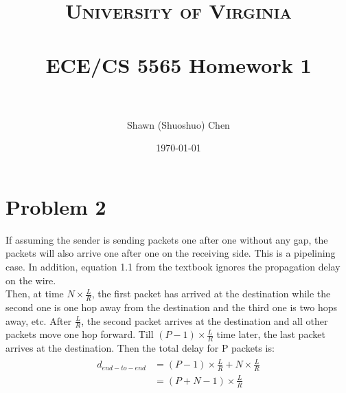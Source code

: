\documentclass[paper=a4, fontsize=11pt]{scrartcl} %
\title{	
\normalfont \normalsize 
\textsc{University of Virginia} \\ [25pt] %
\horrule{0.5pt} \\[0.4cm] %
\huge ECE/CS 5565 Homework 1 \\ %
\horrule{2pt} \\[0.5cm] %
}
\author{Shawn (Shuoshuo) Chen} %
\date{\normalsize\today} %
\numberwithin{equation}{section} %
\numberwithin{figure}{section} %
\numberwithin{table}{section} %
\begin{document}
\maketitle %


\section*{Problem 2}

If assuming the sender is sending packets one after one without any gap, the packets will also arrive one after one
on the receiving side. This is a pipelining case. In addition, equation 1.1 from the textbook ignores the propagation delay on the wire.
\\

Then, at time $N \times \frac{L}{R}$, the first packet has arrived at the destination while the second one is one hop away from the destination and the third one is two hops away, etc. After $\frac{L}{R}$, 
the second packet arrives at the destination and all other packets move one hop forward.
Till $(P-1) \times \frac{L}{R}$ time later, the last packet arrives at the destination. Then the total delay for P packets is:
\begin{align} 
\begin{split}
d_{end-to-end} &= (P-1) \times \frac{L}{R} + N \times \frac{L}{R} \\
&= (P+N-1) \times \frac{L}{R}
\end{split}					
\end{align}
\\


\end{document}
